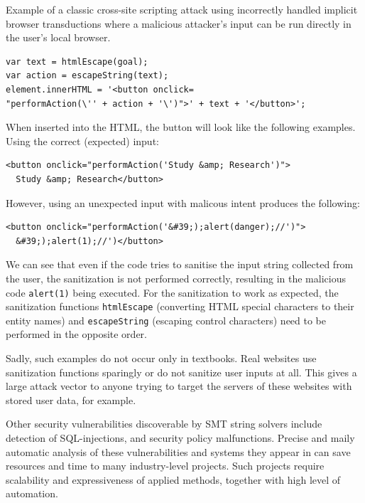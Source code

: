 \begin{listing}[!ht]
\caption{Example of a classic cross-site scripting attack using incorrectly handled implicit browser transductions where a malicious attacker's input can be run directly in the user's local browser.}
\label{listing:not_sanitized_implicit_browser_transductions_example}

    \begin{verbatim}
var text = htmlEscape(goal);
var action = escapeString(text);
element.innerHTML = '<button onclick=
"performAction(\'' + action + '\')">' + text + '</button>';
    \end{verbatim}

    When inserted into the HTML, the button will look like the following examples.
    Using the correct (expected) input:
    \begin{verbatim}
<button onclick="performAction('Study &amp; Research')">
  Study &amp; Research</button>
    \end{verbatim}

    However, using an unexpected input with malicous intent produces the following:

    \begin{verbatim}
<button onclick="performAction('&#39;);alert(danger);//')">
  &#39;);alert(1);//')</button>
    \end{verbatim}
\end{listing}

We can see that even if the code tries to sanitise the input string collected from the user, the sanitization is not performed correctly, resulting in the malicious code \texttt{alert(1)} being executed.
For the sanitization to work as expected, the sanitization functions \texttt{htmlEscape} (converting HTML special characters to their entity names) and \texttt{escapeString} (escaping control characters) need to be performed in the opposite order.

Sadly, such examples do not occur only in textbooks. Real websites use sanitization functions sparingly or do not sanitize user inputs at all.
This gives a large attack vector to anyone trying to target the servers of these websites with stored user data, for example.

Other security vulnerabilities discoverable by SMT string solvers include detection of SQL-injections, and security policy malfunctions.
Precise and maily automatic analysis of these vulnerabilities and systems they appear in can save resources and time to many industry-level projects.
Such projects require scalability and expressiveness of applied methods, together with high level of automation.


